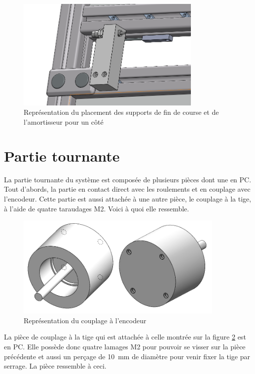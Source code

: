 \begin{figure}[H]
    \centering
    \includegraphics[width = 0.8\textwidth]{assets/figures/PlacementSupports.png}
    \caption{Représentation du placement des supports de fin de course et de l'amortisseur pour un côté}
    \label{fig:PlaceSup}
\end{figure}

\section{Partie tournante}\label{sec:PartieTour}
La partie tournante du système est composée de plusieurs pièces dont une en \acrshort{PC}. Tout d'abords, la partie en contact direct
avec les roulements et en couplage avec l'encodeur. Cette partie est aussi attachée à une autre pièce, le couplage à la tige, à l'aide de
quatre taraudages M2. Voici à quoi elle ressemble.

\begin{figure}[H]
    \centering
    \includegraphics[width = 0.9\textwidth]{assets/figures/CouplageEncodeur.png}
    \caption{Représentation du couplage à l'encodeur}
    \label{fig:CouplEnco}
\end{figure}

La pièce de couplage à la tige qui est attachée à celle montrée sur la figure \ref{fig:CouplEnco} est en \acrshort{PC}. Elle possède donc quatre
lamages M2 pour pouvoir se visser sur la pièce précédente et aussi un perçage de 10~mm de diamètre pour venir fixer la tige par serrage.
La pièce ressemble à ceci.

